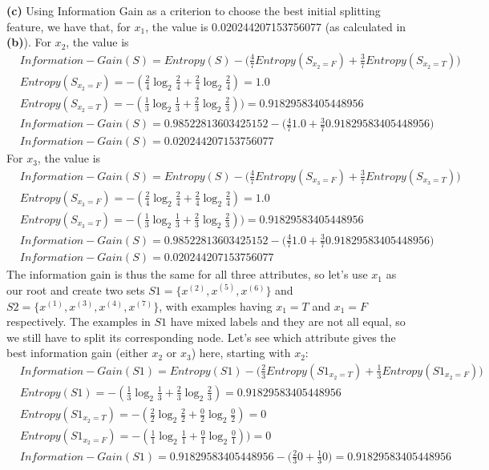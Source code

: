 \documentclass[leqno]{article}
\begin{document}
\noindent \textbf{(c)} Using Information Gain as a criterion to choose the best initial splitting feature, we have that, for 
$x_1$, the value is 0.020244207153756077 (as calculated in \textbf{(b)}). For $x_2$, the value is
\begin{equation*}
\begin{split}
&Information-Gain(S) = Entropy(S) - \Big(\frac{4}{7}Entropy(S_{x_2 = F}) + \frac{3}{7}Entropy(S_{x_2 = T})\Big)\\
&Entropy(S_{x_2 = F}) = -(\frac{2}{4}\log_2\frac{2}{4} + \frac{2}{4}\log_2\frac{2}{4}) = 1.0\\
&Entropy(S_{x_2 = T}) = -(\frac{1}{3}\log_2\frac{1}{3} + \frac{2}{3}\log_2\frac{2}{3})) = 0.91829583405448956\\
&Information-Gain(S) = 0.98522813603425152 -\Big(\frac{4}{7}1.0 + \frac{3}{7}0.91829583405448956\Big) \\
&Information-Gain(S) = 0.020244207153756077
\end{split}
\end{equation*}
For $x_3$, the value is
\begin{equation*}
\begin{split}
&Information-Gain(S) = Entropy(S) - \Big(\frac{4}{7}Entropy(S_{x_3 = F}) + \frac{3}{7}Entropy(S_{x_3 = T})\Big)\\
&Entropy(S_{x_3 = F}) = -(\frac{2}{4}\log_2\frac{2}{4} + \frac{2}{4}\log_2\frac{2}{4}) = 1.0\\
&Entropy(S_{x_3 = T}) = -(\frac{1}{3}\log_2\frac{1}{3} + \frac{2}{3}\log_2\frac{2}{3})) = 0.91829583405448956\\
&Information-Gain(S) = 0.98522813603425152 -\Big(\frac{4}{7}1.0 + \frac{3}{7}0.91829583405448956\Big) \\
&Information-Gain(S) = 0.020244207153756077
\end{split}
\end{equation*}
The information gain is thus the same for all three attributes, so let's use $x_1$ as our root and create two sets 
$S1 = \{x^{(2)}, x^{(5)}, x^{(6)}\}$ and $S2 = \{x^{(1)}, x^{(3)}, x^{(4)}, x^{(7)}\}$, 
with examples having $x_1 = T$ and $x_1 = F$ respectively. The examples in $S1$ have mixed labels and they are not all 
equal, so we still have to split its corresponding node. Let's see which attribute gives the best information gain (either 
$x_2$ or $x_3$) here, starting with $x_2$:
\begin{equation*}
\begin{split}
&Information-Gain(S1) = Entropy(S1) - \Big(\frac{2}{3}Entropy(S1_{x_2 = T}) + \frac{1}{3}Entropy(S1_{x_2 = F})\Big)\\
&Entropy(S1) = -(\frac{1}{3}\log_2\frac{1}{3} + \frac{2}{3}\log_2\frac{2}{3}) = 0.91829583405448956 \\
&Entropy(S1_{x_2 = T}) = -(\frac{2}{2}\log_2\frac{2}{2} + \frac{0}{2}\log_2\frac{0}{2}) = 0\\
&Entropy(S1_{x_2 = F}) = -(\frac{1}{1}\log_2\frac{1}{1} + \frac{0}{1}\log_2\frac{0}{1})) = 0\\
&Information-Gain(S1) = 0.91829583405448956 -\Big(\frac{2}{3}0 + \frac{1}{3}0\Big) = 0.91829583405448956 \\
\end{split}
\end{equation*}
\end{document}
